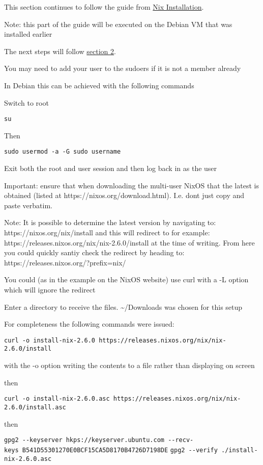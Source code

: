 This section continues to follow the guide from
\href{https://github.com/fort-nix/nix-bitcoin/blob/master/docs/install.md}{Nix
Installation}.

Note: this part of the guide will be executed on the Debian VM that was
installed earlier

The next steps will follow
\href{https://github.com/fort-nix/nix-bitcoin/blob/master/docs/install.md\#2-nix-installation}{section
2}.

You may need to add your user to the sudoers if it is not a member
already

In Debian this can be achieved with the following commands

Switch to root

\texttt{su}

Then

\texttt{sudo\ usermod\ -a\ -G\ sudo\ username}

Exit both the root and user session and then log back in as the user

Important: ensure that when downloading the multi-user NixOS that the
latest is obtained (listed at https://nixos.org/download.html). I.e.
dont just copy and paste verbatim.

Note: It is possible to determine the latest version by navigating to:
https://nixos.org/nix/install and this will redirect to for example:
https://releases.nixos.org/nix/nix-2.6.0/install at the time of writing.
From here you could quickly santiy check the redirect by heading to:
https://releases.nixos.org/?prefix=nix/

You could (as in the example on the NixOS website) use curl with a -L
option which will ignore the redirect

Enter a directory to receive the files. \textasciitilde/Downloads was
chosen for this setup

For completeness the following commands were issued:

\texttt{curl\ -o\ install-nix-2.6.0\ https://releases.nixos.org/nix/nix-2.6.0/install}

with the -o option writing the contents to a file rather than displaying
on screen

then

\texttt{curl\ -o\ install-nix-2.6.0.asc\ https://releases.nixos.org/nix/nix-2.6.0/install.asc}

then

\texttt{gpg2\ -\/-keyserver\ hkps://keyserver.ubuntu.com\ -\/-recv-keys\ B541D55301270E0BCF15CA5D8170B4726D7198DE}
\texttt{gpg2\ -\/-verify\ ./install-nix-2.6.0.asc}

